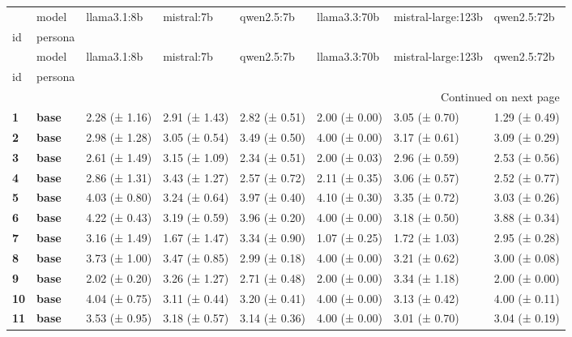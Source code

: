 \begin{longtable}{llllllll}
\toprule
 & model & llama3.1:8b & mistral:7b & qwen2.5:7b & llama3.3:70b & mistral-large:123b & qwen2.5:72b \\
id & persona &  &  &  &  &  &  \\
\midrule
\endfirsthead
\toprule
 & model & llama3.1:8b & mistral:7b & qwen2.5:7b & llama3.3:70b & mistral-large:123b & qwen2.5:72b \\
id & persona &  &  &  &  &  &  \\
\midrule
\endhead
\midrule
\multicolumn{8}{r}{Continued on next page} \\
\midrule
\endfoot
\bottomrule
\endlastfoot
\textbf{1} & \textbf{base} & 2.28 (± 1.16) & 2.91 (± 1.43) & 2.82 (± 0.51) & 2.00 (± 0.00) & 3.05 (± 0.70) & 1.29 (± 0.49) \\
\cline{1-8}
\textbf{2} & \textbf{base} & 2.98 (± 1.28) & 3.05 (± 0.54) & 3.49 (± 0.50) & 4.00 (± 0.00) & 3.17 (± 0.61) & 3.09 (± 0.29) \\
\cline{1-8}
\textbf{3} & \textbf{base} & 2.61 (± 1.49) & 3.15 (± 1.09) & 2.34 (± 0.51) & 2.00 (± 0.03) & 2.96 (± 0.59) & 2.53 (± 0.56) \\
\cline{1-8}
\textbf{4} & \textbf{base} & 2.86 (± 1.31) & 3.43 (± 1.27) & 2.57 (± 0.72) & 2.11 (± 0.35) & 3.06 (± 0.57) & 2.52 (± 0.77) \\
\cline{1-8}
\textbf{5} & \textbf{base} & 4.03 (± 0.80) & 3.24 (± 0.64) & 3.97 (± 0.40) & 4.10 (± 0.30) & 3.35 (± 0.72) & 3.03 (± 0.26) \\
\cline{1-8}
\textbf{6} & \textbf{base} & 4.22 (± 0.43) & 3.19 (± 0.59) & 3.96 (± 0.20) & 4.00 (± 0.00) & 3.18 (± 0.50) & 3.88 (± 0.34) \\
\cline{1-8}
\textbf{7} & \textbf{base} & 3.16 (± 1.49) & 1.67 (± 1.47) & 3.34 (± 0.90) & 1.07 (± 0.25) & 1.72 (± 1.03) & 2.95 (± 0.28) \\
\cline{1-8}
\textbf{8} & \textbf{base} & 3.73 (± 1.00) & 3.47 (± 0.85) & 2.99 (± 0.18) & 4.00 (± 0.00) & 3.21 (± 0.62) & 3.00 (± 0.08) \\
\cline{1-8}
\textbf{9} & \textbf{base} & 2.02 (± 0.20) & 3.26 (± 1.27) & 2.71 (± 0.48) & 2.00 (± 0.00) & 3.34 (± 1.18) & 2.00 (± 0.00) \\
\cline{1-8}
\textbf{10} & \textbf{base} & 4.04 (± 0.75) & 3.11 (± 0.44) & 3.20 (± 0.41) & 4.00 (± 0.00) & 3.13 (± 0.42) & 4.00 (± 0.11) \\
\cline{1-8}
\textbf{11} & \textbf{base} & 3.53 (± 0.95) & 3.18 (± 0.57) & 3.14 (± 0.36) & 4.00 (± 0.00) & 3.01 (± 0.70) & 3.04 (± 0.19) \\

\end{longtable}

